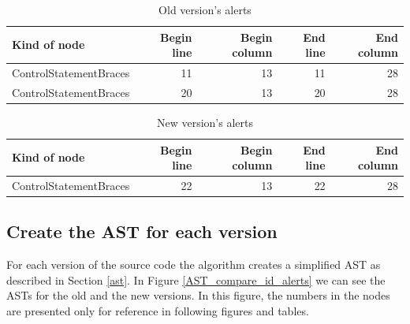 \documentclass[
]{article}
\begin{document}
\small

\begin{table}[H]

\caption{\label{tab:unnamed-chunk-3}Old version's alerts\label{old_alerts}}
\centering
\begin{tabular}[t]{l|r|r|r|r}
\hline
Kind of node & Begin line & Begin column & End line & End column\\
\hline
\rowcolor{gray!6}  ControlStatementBraces & 11 & 13 & 11 & 28\\
\hline
ControlStatementBraces & 20 & 13 & 20 & 28\\
\hline
\end{tabular}
\end{table}

\normalsize

\small

\begin{table}[H]

\caption{\label{tab:unnamed-chunk-4}New version's alerts\label{new_alerts}}
\centering
\begin{tabular}[t]{l|r|r|r|r}
\hline
Kind of node & Begin line & Begin column & End line & End column\\
\hline
\rowcolor{gray!6}  ControlStatementBraces & 22 & 13 & 22 & 28\\
\hline
\end{tabular}
\end{table}

\normalsize

\subsection{Create the AST for each version}

For each version of the source code the algorithm creates a simplified
AST as described in Section \ref{ast}. In Figure
\ref{AST_compare_id_alerts} we can see the ASTs for the old and the new
versions. In this figure, the numbers in the nodes are presented only 
for reference in following figures and tables.


\small
\end{document}
